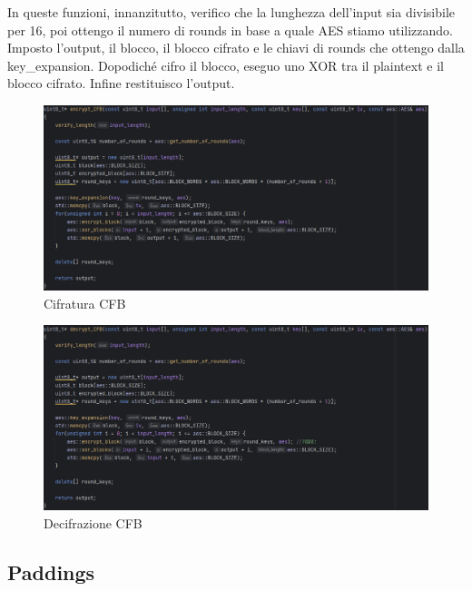 \textsf{\small In queste funzioni, innanzitutto, verifico che la lunghezza dell'input sia divisibile per 16, poi ottengo il numero di rounds in base a quale AES stiamo utilizzando. Imposto l'output, il blocco, il blocco cifrato e le chiavi di rounds che ottengo dalla key\_expansion. Dopodiché cifro il blocco, eseguo uno XOR tra il plaintext e il blocco cifrato. Infine restituisco l'output.} %

\begin{figure}[H]
	\centering
	\includegraphics[width=1\textwidth, height=1\textheight, keepaspectratio]{./images/code/cpp/modes/encrypt_CFB.PNG}
	\caption{Cifratura CFB}
	\label{fig:encrypt_CFB}
\end{figure}

\textsf{\small }

\begin{figure}[H]
	\centering
	\includegraphics[width=1\textwidth, height=1\textheight, keepaspectratio]{./images/code/cpp/modes/decrypt_CFB.PNG}
	\caption{Decifrazione CFB}
	\label{fig:decrypt_CFB}
\end{figure}

\subsection{Paddings}

